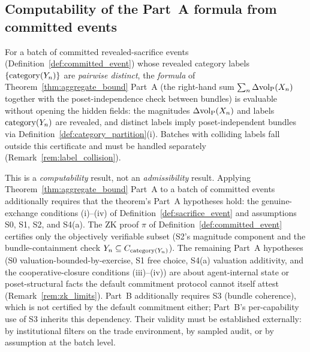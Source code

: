 \subsection{Computability of the Part~A formula from committed
events}

\begin{proposition}
\label{prop:commit_preserves}
For a batch of committed revealed-sacrifice events
(Definition~\ref{def:committed_event}) whose revealed category
labels $\{\mathrm{category}(Y_{n})\}$ are \emph{pairwise distinct}, the
\emph{formula} of Theorem~\ref{thm:aggregate_bound} Part~A (the
right-hand sum $\sum_n \Delta{\operatorname{vol}_{\mathrm{P}}}(X_n)$ together with the
poset-independence check between bundles) is evaluable without
opening the hidden fields: the magnitudes $\Delta{\operatorname{vol}_{\mathrm{P}}}(X_n)$ and
labels $\mathrm{category}(Y_{n})$ are revealed, and distinct labels imply
poset-independent bundles via
Definition~\ref{def:category_partition}(i).  Batches with
colliding labels fall outside this certificate and must be
handled separately (Remark~\ref{rem:label_collision}).

This is a \emph{computability} result, not an
\emph{admissibility} result.  Applying
Theorem~\ref{thm:aggregate_bound} Part~A to a batch of committed
events additionally requires that the theorem's Part~A
hypotheses hold: the genuine-exchange conditions (i)--(iv) of
Definition~\ref{def:sacrifice_event} and assumptions S0, S1,
S2, and S4(a).  The ZK proof $\pi$ of
Definition~\ref{def:committed_event} certifies only the
objectively verifiable subset (S2's magnitude component and
the bundle-containment check
$Y_n \subseteq C_{\mathrm{category}(Y_{n})}$).  The remaining
Part~A hypotheses (S0 valuation-bounded-by-exercise, S1
free choice, S4(a) valuation additivity, and the
cooperative-closure conditions (iii)--(iv)) are about
agent-internal state or poset-structural facts the default
commitment protocol cannot itself attest
(Remark~\ref{rem:zk_limits}).  Part~B additionally requires
S3 (bundle coherence), which is not certified by the default
commitment either; Part~B's per-capability use of S3 inherits
this dependency.  Their validity must be
established externally: by institutional filters on the trade
environment, by sampled audit, or by assumption at the batch
level.
\end{proposition}

